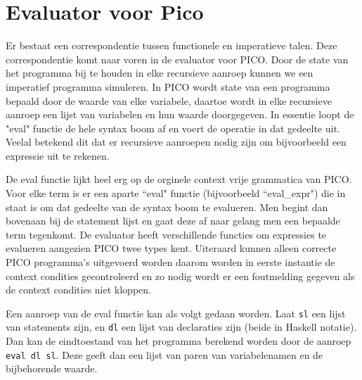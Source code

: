 \documentclass[12pt]{article}
\begin{document}
    \section{Evaluator voor Pico}
    
    Er bestaat een correspondentie tussen functionele en imperatieve talen. Deze correspondentie komt naar voren in de evaluator voor PICO. Door de state van het programma bij te houden in elke recursieve aanroep kunnen we een imperatief programma simuleren. In PICO wordt state van een programma bepaald door de waarde van elke variabele, daartoe wordt in elke recursieve aanroep een lijst van variabelen en hun waarde doorgegeven. In essentie loopt de "eval" functie de hele syntax boom af en voert de operatie in dat gedeelte uit. Veelal betekend dit dat er recursieve aanroepen nodig zijn om bijvoorbeeld een expressie uit te rekenen.
    
    De eval functie lijkt heel erg op de orginele context vrije grammatica van PICO. Voor elke term is er een aparte ``eval" functie (bijvoorbeeld ``eval\_expr") die in staat is om dat gedeelte van de syntax boom te evalueren. Men begint dan bovenaan bij de statement lijst en gaat deze af naar gelang men een bepaalde term tegenkomt. De evaluator heeft verschillende functies om expressies te evalueren aangezien PICO twee types kent. Uiteraard kunnen alleen correcte PICO programma's uitgevoerd worden daarom worden in eerste instantie de context condities gecontroleerd en zo nodig wordt er een foutmelding gegeven als de context condities niet kloppen.
    
    Een aanroep van de eval functie kan als volgt gedaan worden. Laat \texttt{sl} een lijst van statements zijn, en \texttt{dl} een lijst van declaraties zijn (beide in Haskell notatie). Dan kan de eindtoestand van het programma berekend worden door de aanroep \texttt{eval dl sl}. Deze geeft dan een lijst van paren van variabelenamen en de bijbehorende waarde.
    


	
	
	\begin{thebibliography}{XXXX}
		
		
	\end{thebibliography}
	
\end{document}

